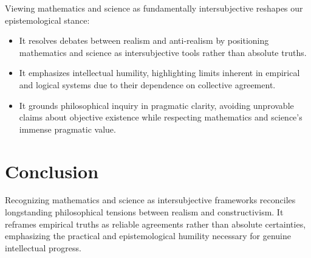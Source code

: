 \documentclass{article}
\begin{document}
Viewing mathematics and science as fundamentally intersubjective reshapes our epistemological stance:

\begin{itemize}
    \item It resolves debates between realism and anti-realism by positioning mathematics and science as intersubjective tools rather than absolute truths.
    \item It emphasizes intellectual humility, highlighting limits inherent in empirical and logical systems due to their dependence on collective agreement.
    \item It grounds philosophical inquiry in pragmatic clarity, avoiding unprovable claims about objective existence while respecting mathematics and science's immense pragmatic value.
\end{itemize}

\section{Conclusion}

Recognizing mathematics and science as intersubjective frameworks reconciles longstanding philosophical tensions between realism and constructivism. It reframes empirical truths as reliable agreements rather than absolute certainties, emphasizing the practical and epistemological humility necessary for genuine intellectual progress.
\end{document}
